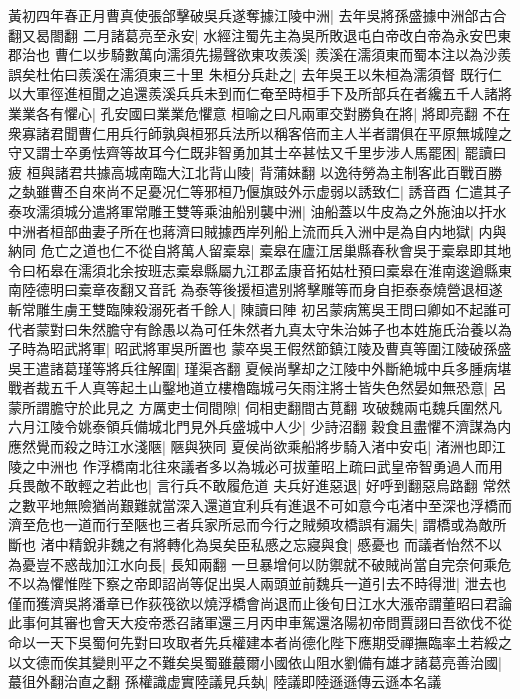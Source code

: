 黃初四年春正月曹真使張郃擊破吳兵遂奪據江陵中洲|{
	去年吳將孫盛據中洲郃古合翻又曷閤翻}
二月諸葛亮至永安|{
	水經注蜀先主為吳所敗退屯白帝改白帝為永安巴東郡治也}
曹仁以步騎數萬向濡須先揚聲欲東攻羨溪|{
	羨溪在濡須東而蜀本注以為沙羨誤矣杜佑曰羨溪在濡須東三十里}
朱桓分兵赴之|{
	去年吳王以朱桓為濡須督}
既行仁以大軍徑進桓聞之追還羨溪兵兵未到而仁奄至時桓手下及所部兵在者纔五千人諸將業業各有懼心|{
	孔安國曰業業危懼意}
桓喻之曰凡兩軍交對勝負在將|{
	將即亮翻}
不在衆寡諸君聞曹仁用兵行師孰與桓邪兵法所以稱客倍而主人半者謂俱在平原無城隍之守又謂士卒勇怯齊等故耳今仁既非智勇加其士卒甚怯又千里步涉人馬罷困|{
	罷讀曰疲}
桓與諸君共據高城南臨大江北背山陵|{
	背蒲妹翻}
以逸待勞為主制客此百戰百勝之埶雖曹丕自來尚不足憂况仁等邪桓乃偃旗豉外示虚弱以誘致仁|{
	誘音酉}
仁遣其子泰攻濡須城分遣將軍常雕王雙等乘油船别襲中洲|{
	油船蓋以牛皮為之外施油以扞水}
中洲者桓部曲妻子所在也蔣濟曰賊據西岸列船上流而兵入洲中是為自内地獄|{
	内與納同}
危亡之道也仁不從自將萬人留槖皋|{
	槖皋在廬江居巢縣春秋會吳于槖皋即其地令曰柘皋在濡須北余按班志槖皋縣屬九江郡孟康音拓姑杜預曰槖皋在淮南逡遒縣東南陸德明曰槖章夜翻又音託}
為泰等後援桓遣别將擊雕等而身自拒泰泰燒營退桓遂斬常雕生虜王雙臨陳殺溺死者千餘人|{
	陳讀曰陣}
初呂蒙病篤吳王問曰卿如不起誰可代者蒙對曰朱然膽守有餘愚以為可任朱然者九真太守朱治姊子也本姓施氏治養以為子時為昭武將軍|{
	昭武將軍吳所置也}
蒙卒吳王假然節鎮江陵及曹真等圍江陵破孫盛吳王遣諸葛瑾等將兵往解圍|{
	瑾渠吝翻}
夏候尚擊却之江陵中外斷絶城中兵多腫病堪戰者裁五千人真等起土山鑿地道立樓櫓臨城弓矢雨注將士皆失色然晏如無恐意|{
	呂蒙所謂膽守於此見之}
方厲吏士伺間隙|{
	伺相吏翻間古莧翻}
攻破魏兩屯魏兵圍然凡六月江陵令姚泰領兵備城北門見外兵盛城中人少|{
	少詩沼翻}
穀食且盡懼不濟謀為内應然覺而殺之時江水淺陿|{
	陿與狹同}
夏侯尚欲乘船將步騎入渚中安屯|{
	渚洲也即江陵之中洲也}
作浮橋南北往來議者多以為城必可拔董昭上疏曰武皇帝智勇過人而用兵畏敵不敢輕之若此也|{
	言行兵不敢履危道}
夫兵好進惡退|{
	好呼到翻惡烏路翻}
常然之數平地無險猶尚艱難就當深入還道宜利兵有進退不可如意今屯渚中至深也浮橋而濟至危也一道而行至陿也三者兵家所忌而今行之賊頻攻橋誤有漏失|{
	謂橋或為敵所斷也}
渚中精銳非魏之有將轉化為吳矣臣私慼之忘寢與食|{
	慼憂也}
而議者怡然不以為憂豈不惑哉加江水向長|{
	長知兩翻}
一旦暴增何以防禦就不破賊尚當自完奈何乘危不以為懼惟陛下察之帝即詔尚等促出吳人兩頭並前魏兵一道引去不時得泄|{
	泄去也}
僅而獲濟吳將潘章已作荻筏欲以燒浮橋會尚退而止後旬日江水大漲帝謂董昭曰君論此事何其審也會天大疫帝悉召諸軍還三月丙申車駕還洛陽初帝問賈詡曰吾欲伐不從命以一天下吳蜀何先對曰攻取者先兵權建本者尚德化陛下應期受禪撫臨率土若綏之以文德而俟其變則平之不難矣吳蜀雖蕞爾小國依山阻水劉備有雄才諸葛亮善治國|{
	蕞徂外翻治直之翻}
孫權識虚實陸議見兵埶|{
	陸議即陸遜遜傳云遜本名議}
